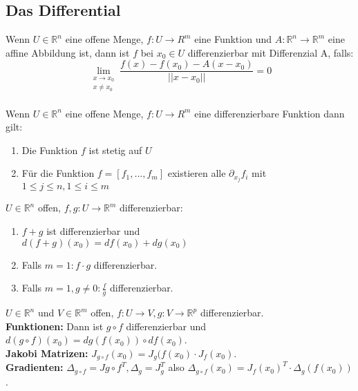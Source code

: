 \subsection{Das Differential}
  Wenn \(U\in\mathbb R^n\) eine offene Menge, \(f:U\rightarrow R^m\) eine Funktion und $A: \mathbb R^n\rightarrow\mathbb R^m$ eine affine Abbildung ist, dann ist $f$ bei $x_0\in U$ differenzierbar mit Differenzial A, falls:
  \[\lim\limits_{\substack{x\rightarrow x_0 \\ x\neq x_0}}\frac{f(x)-f(x_0)-A(x-x_0)}{||x-x_0||}=0\]\\
  Wenn \(U\in\mathbb R^n\) eine offene Menge, \(f:U\rightarrow R^m\) eine differenzierbare Funktion dann gilt:
  \begin{enumerate}
    \item Die Funktion $f$ ist stetig auf $U$
    \item Für die Funktion $f=[f_1,...,f_m]$ existieren alle \(\partial_{x_j}f_i\) mit \(1\leq j \leq n, 1\leq i\leq m\)
  \end{enumerate}
  \(U\in\mathbb R^n\) offen, \(f,g:U\rightarrow\mathbb R^m\) differenzierbar:
  \begin{enumerate}
    \item \(f+g\) ist differenzierbar und \\ $d(f+g)(x_0)=df(x_0)+dg(x_0)$
    \item Falls \(m=1: f\cdot g\) differenzierbar.
    \item Falls \(m=1, g\neq0:\frac f g\) differenzierbar.
  \end{enumerate}
 \(U\in\mathbb R^n\) und \(V\in\mathbb R^m\) offen, \(f:U\rightarrow V, g:V\rightarrow\mathbb R^p\) differenzierbar.\\
\textbf{Funktionen:} 
Dann ist $g\circ f$ differenzierbar und $d(g\circ f)(x_0)=dg(f(x_0))\circ df(x_0)$.\\
\textbf{Jakobi Matrizen:}
\(J_{g\circ f}(x_0)=J_g(f(x_0)\cdot J_f(x_0)\).\\
\textbf{Gradienten:}
\(\Delta_{g\circ f}=J{g\circ f}^T, \Delta_g=J_g^T\) also
\(\Delta_{g\circ f}(x_0)=J_f(x_0)^T\cdot\Delta_g(f(x_0))\).\\
